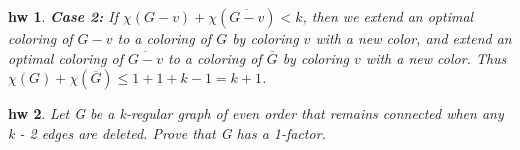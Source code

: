 \documentclass[twocolumn]{article}
\newtheorem{problem}{problem}
\newtheorem{solution}{solution}
\newtheorem{hw}{hw}
\begin{document}
\begin{CJK*}{UTF8}{bkai}
\begin{hw}
\textbf{Case 2:} If $\chi(G - v) + \chi(\overline{G - v}) < k$, then we extend an optimal coloring of $G - v$ to a coloring of $G$ by coloring $v$ with a new color, and extend an optimal coloring of $\overline{G - v}$ to a coloring of $\overline{G}$ by coloring $v$ with a new color. Thus $\chi(G) + \chi(\overline{G}) \leq 1 + 1 + k - 1 = k + 1$.

\end{hw}

\begin{hw}
    Let G be a k-regular graph of even order that remains connected when any k - 2 edges are deleted. Prove that G has a 1-factor.
\end{hw}

    

    



\end{CJK*}
\end{document}
